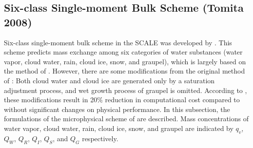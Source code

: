 \subsection{Six-class Single-moment Bulk Scheme (Tomita 2008)}
Six-class single-moment bulk scheme in the SCALE was developed by \citet{tomita_2008}.
This scheme predicts mass exchange among six categories of water substances (water vapor, cloud water, rain, cloud ice, snow, and graupel), which is largely based on the method of \citet{lin_etal_1983}.
However, there are some modifications from the original method of \citet{lin_etal_1983}: Both cloud water and cloud ice are generated only by a saturation adjustment process, and wet growth process of graupel is omitted.
According to \citet{tomita_2008}, these modifications result in 20\% reduction in computational cost compared to \citet{lin_etal_1983} without significant changes on physical performance.
In this subsection, the formulations of the microphysical scheme of \citet{tomita_2008} are described.
Mass concentrations of water vapor, cloud water, rain, cloud ice, snow, and graupel are indicated by $q_{v}$, $Q_{W}$, $Q_{R}$, $Q_{I}$, $Q_{S}$, and $Q_{G}$ respectively.

